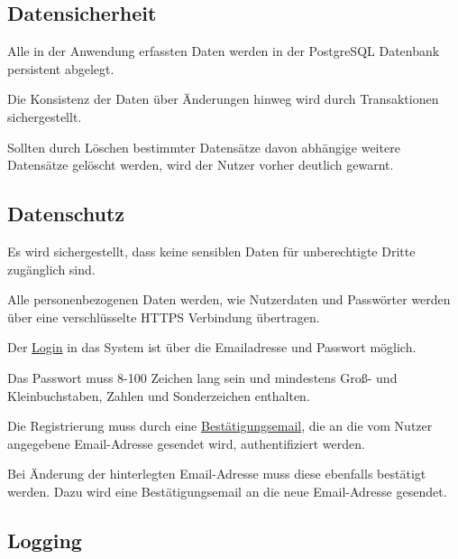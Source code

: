 \subsection{Datensicherheit}

\begin{description}
	 Alle in der Anwendung erfassten Daten werden in der PostgreSQL Datenbank persistent abgelegt.

	 Die Konsistenz der Daten über Änderungen hinweg wird durch Transaktionen sichergestellt.

	 Sollten durch Löschen bestimmter Datensätze davon abhängige weitere Datensätze gelöscht werden, wird der Nutzer vorher deutlich gewarnt.
\end{description}

\subsection{Datenschutz}

\begin{description}
	 Es wird sichergestellt, dass keine sensiblen Daten für unberechtigte Dritte zugänglich sind.

	 Alle personenbezogenen Daten werden, wie Nutzerdaten und Passwörter werden über eine verschlüsselte HTTPS Verbindung übertragen.

	 Der \hyperref[funkt:080]{Login} in das System ist über die Emailadresse und Passwort möglich.

	 Das Passwort muss 8-100 Zeichen lang sein und mindestens Groß- und Kleinbuchstaben, Zahlen und Sonderzeichen enthalten.

	 Die Registrierung muss durch eine \hyperref[funkt:060]{Bestätigungsemail}, die an die vom Nutzer angegebene Email-Adresse gesendet wird, authentifiziert werden.

	 Bei Änderung der hinterlegten Email-Adresse muss diese ebenfalls bestätigt werden. Dazu wird eine Bestätigungsemail an die neue Email-Adresse gesendet.
\end{description}

\subsection{Logging}


